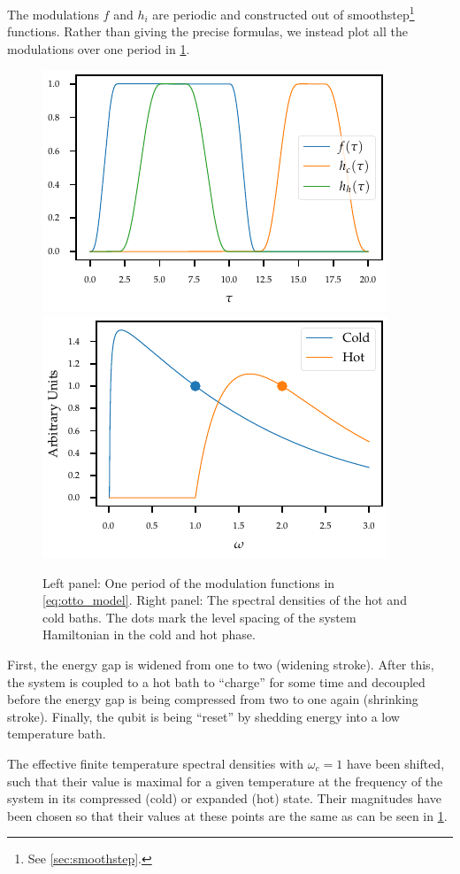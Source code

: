 The modulations \(f\) and \(h_{i}\) are periodic and constructed out
of smoothstep\footnote{See \cref{sec:smoothstep}.} functions. Rather
than giving the precise formulas, we instead plot all the modulations
over one period in \cref{fig:ottomod}.
\begin{figure}[hp]
  \centering
  \includegraphics{figs/otto/modulation}
  \includegraphics{figs/otto/spectral_densities}
  \caption{\label{fig:ottomod} Left panel: One period of the modulation functions
    in \cref{eq:otto_model}. Right panel: The spectral densities of
    the hot and cold baths. The dots mark the level spacing of the
    system Hamiltonian in the cold and hot phase.}
\end{figure}

First, the energy gap is widened from one to two (widening
stroke). After this, the system is coupled to a hot bath to ``charge''
for some time and decoupled before the energy gap is being compressed
from two to one again (shrinking stroke). Finally, the qubit is being
``reset'' by shedding energy into a low temperature bath.

The effective finite temperature spectral
densities with \(ω_{c}=1\) have been shifted, such that their value is
maximal for a given temperature at the frequency of the system in its
compressed (cold) or expanded (hot) state. Their magnitudes have been
chosen so that their values at these points are the same as can be
seen in \cref{fig:ottomod}.

